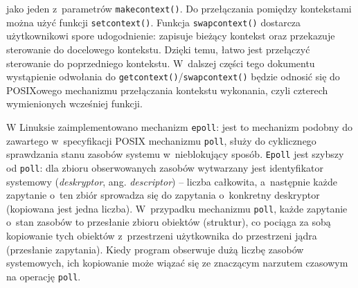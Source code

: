 \documentclass[12pt]{mwart}
\newcommand{\code}{\texttt}
\newcommand{\procbr}{()}
\newcommand{\function}[1]{\code{#1\procbr}}
\begin{document}
  jako jeden z~parametrów \function{makecontext}.
  Do przełączania pomiędzy kontekstami można użyć funkcji \function{setcontext}. Funkcja \function{swapcontext} dostarcza użytkownikowi spore udogodnienie: zapisuje bieżący kontekst oraz przekazuje sterowanie
  do docelowego kontekstu. Dzięki temu, łatwo jest przełączyć sterowanie do poprzedniego kontekstu.
  W~dalszej części tego dokumentu wystąpienie odwołania do \function{getcontext}/\function{swapcontext} będzie odnosić się do POSIX\dywiz owego mechanizmu przełączania kontekstu wykonania, czyli 
  czterech wymienionych wcześniej funkcji.
\par
%
\indent
  W Linuksie zaimplementowano mechanizm \code{epoll}: jest to mechanizm podobny do
  zawartego w~specyfikacji POSIX mechanizmu \code{poll}, służy do cyklicznego sprawdzania stanu zasobów systemu w~nieblokujący sposób.
  \code{Epoll} jest szybszy od \code{poll}: dla zbioru obserwowanych zasobów wytwarzany jest identyfikator systemowy 
  (\emph{deskryptor}, ang. \emph{descriptor}) -- liczba całkowita, a~następnie każde zapytanie o~ten zbiór sprowadza się do zapytania
  o~konkretny deskryptor (kopiowana jest jedna liczba). W~przypadku mechanizmu \code{poll}, każde zapytanie o~stan zasobów to przesłanie zbioru obiektów (struktur),
  co pociąga za sobą kopiowanie tych obiektów z~przestrzeni użytkownika do przestrzeni jądra (przesłanie zapytania). Kiedy program obserwuje dużą liczbę
  zasobów systemowych, ich kopiowanie może wiązać się ze znaczącym narzutem czasowym na operację \code{poll}.
\par
\end{document}
